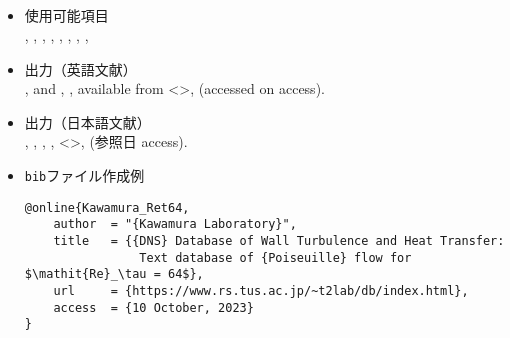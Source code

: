 \documentclass[a4paper,fleqn,uplatex,dvipdfmx]{jsarticle}
\begin{document}
\subsection{\ttonline}
\label{ssec:online}
\begin{tcolorbox}[enhanced, title=\ttonline, drop fuzzy shadow]
    \begin{itemize}
        \item 使用可能項目 \\
        \ttauthor, \tttitle, \tthowpublished, \ttmonth, \ttyear, \tturl, \ttdoi, \ttaccess, \ttnote
        \item 出力（英語文献） \\
            \colorbox[gray]{0.8}{\ttauthorf}, \colorbox[gray]{0.8}{\ttauthors} and \colorbox[gray]{0.8}{\ttauthort}, \colorbox[gray]{0.8}{\tttitle}, available from \textless\colorbox[gray]{0.8}{\tturl}\textgreater, (accessed on \colorbox[gray]{0.8}{access}).
        \item 出力（日本語文献） \\
            \colorbox[gray]{0.8}{\ttauthorf}, \colorbox[gray]{0.8}{\ttauthors}, \colorbox[gray]{0.8}{\ttauthort}, \colorbox[gray]{0.8}{\tttitle}, \textless\colorbox[gray]{0.8}{\tturl}\textgreater, (参照日 \colorbox[gray]{0.8}{access}).
        \item \verb|bib|ファイル作成例 \vspace{-3mm}
\begin{verbatim}
@online{Kawamura_Ret64,
    author  = "{Kawamura Laboratory}",
    title   = {{DNS} Database of Wall Turbulence and Heat Transfer: 
                Text database of {Poiseuille} flow for $\mathit{Re}_\tau = 64$},
    url     = {https://www.rs.tus.ac.jp/~t2lab/db/index.html},
    access  = {10 October, 2023}
}
\end{verbatim}
    \end{itemize}
\end{tcolorbox}
\end{document}
